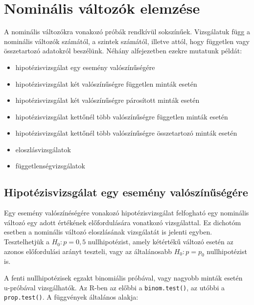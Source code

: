 \documentclass[
]{book}
\providecommand{\tightlist}{%
  \setlength{\itemsep}{0pt}\setlength{\parskip}{0pt}}
\begin{document}
\hypertarget{nominuxe1lis-vuxe1ltozuxf3k-elemzuxe9se}{%
\section{Nominális változók elemzése}\label{nominuxe1lis-vuxe1ltozuxf3k-elemzuxe9se}}

A nominális változókra vonakozó próbák rendkívül sokszínűek. Vizsgálatuk függ a nominális változók számától, a szintek számától, illetve attól, hogy független vagy összetartozó adatokról beszélünk. Néhány alfejezetben ezekre mutatunk példát:

\begin{itemize}
\tightlist
\item
  hipotézisvizsgálat egy esemény valószínűségére
\item
  hipotézisvizsgálat két valószínűségre független minták esetén
\item
  hipotézisvizsgálat két valószínűségre párosított minták esetén
\item
  hipotézisvizsgálat kettőnél több valószínűségre független minták esetén
\item
  hipotézisvizsgálat kettőnél több valószínűségre összetartozó minták esetén
\item
  eloszlásvizsgálatok
\item
  függetlenségvizsgálatok
\end{itemize}

\hypertarget{hipotuxe9zisvizsguxe1lat-egy-esemuxe9ny-valuxf3szuxednux171suxe9guxe9re}{%
\subsection{Hipotézisvizsgálat egy esemény valószínűségére}\label{hipotuxe9zisvizsguxe1lat-egy-esemuxe9ny-valuxf3szuxednux171suxe9guxe9re}}

Egy esemény valószínéségére vonakozó hipotézisvizsgálat felfogható egy nominális változó egy adott értékének előfordulására vonatkozó vizsgálattal. Ez dichotóm esetben a nominális változó eloszlásának vizsgálatát is jelenti egyben. Tesztelhetjük a \(H_0:p=0,5\) nullhipotézist, amely kétértékű változó esetén az azonos előfordulási arányt teszteli, vagy az általánosabb \(H_0:p=p_0\) nullhipotézist is.

A fenti nullhipotézisek egzakt binomiális próbával, vagy nagyobb minták esetén u-próbával vizsgálhatók. Az R-ben az előbbi a \texttt{binom.test()}, az utóbbi a \texttt{prop.test()}. A függvények általános alakja:
\end{document}
